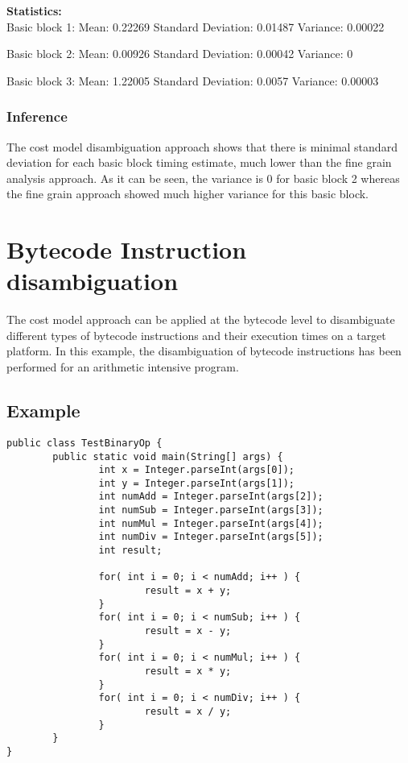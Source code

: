 \textbf{Statistics: }\\

Basic block 1:
\hspace{2em} Mean: 0.22269
\hspace{2em} Standard Deviation: 0.01487
\hspace{2em} Variance: 0.00022

Basic block 2:
\hspace{2em} Mean: 0.00926
\hspace{2em} Standard Deviation: 0.00042
\hspace{2em} Variance: 0

Basic block 3:
\hspace{2em} Mean: 1.22005
\hspace{2em} Standard Deviation: 0.0057
\hspace{2em} Variance: 0.00003

\subsubsection{Inference}

The cost model disambiguation approach shows that there is minimal standard deviation for each basic block timing estimate, much lower than the fine grain analysis approach. As it can be seen, the variance is 0 for basic block 2 whereas the fine grain approach showed much higher variance for this basic block.

\section{Bytecode Instruction disambiguation}
The cost model approach can be applied at the bytecode level to disambiguate different types of bytecode instructions and their execution times on a target platform. In this example, the disambiguation of bytecode instructions has been performed for an arithmetic intensive program.
\subsection{Example}
\singlespacing
\begin{lstlisting}
public class TestBinaryOp {
        public static void main(String[] args) {
                int x = Integer.parseInt(args[0]);
                int y = Integer.parseInt(args[1]);
                int numAdd = Integer.parseInt(args[2]);
                int numSub = Integer.parseInt(args[3]);
                int numMul = Integer.parseInt(args[4]);
                int numDiv = Integer.parseInt(args[5]);
                int result;
              
                for( int i = 0; i < numAdd; i++ ) {
                        result = x + y;
                }
                for( int i = 0; i < numSub; i++ ) {
                        result = x - y;
                }
                for( int i = 0; i < numMul; i++ ) {
                        result = x * y;
                }
                for( int i = 0; i < numDiv; i++ ) {
                        result = x / y;
                }
        }
}
\end{lstlisting}
\doublespacing

